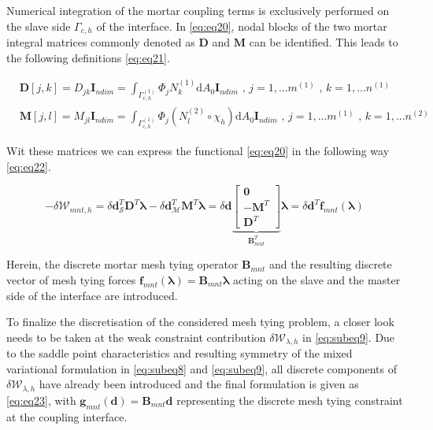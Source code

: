 \documentclass[a4paper,10pt]{article} %
\begin{document}
Numerical integration of the mortar coupling terms is exclusively performed on the slave side $\Gamma_{c,h}$ of the interface. In \eqref{eq:eq20}, nodal blocks of the two mortar integral matrices commonly denoted as $\mathbf{D}$ and $\mathbf{M}$ can be identified. This leads to the following definitions \eqref{eq:eq21}.

\begin{subequations}\label{eq:eq21}
    \begin{align}
        & \mathbf{D}[j,k] = D_{jk} \mathbf{I}_{ndim} = \int_{\Gamma_{c,h}^{(1)}} \Phi_j N_k^{(1)}\text{d}A_0\mathbf{I}_{ndim}\text{ , } j=1,...m^{(1)}\text{ , } k= 1, ...n^{(1)} \\
        & \mathbf{M}[j,l] = M_{jl} \mathbf{I}_{ndim} = \int_{\Gamma_{c,h}^{(1)}} \Phi_j \left(N_l^{(2)} \circ \chi_h \right)\text{d}A_0\mathbf{I}_{ndim}\text{ , } j=1,...m^{(1)}\text{ , } k= 1, ...n^{(2)}
    \end{align}
\end{subequations}

Wit these matrices we can express the functional \eqref{eq:eq20} in the following way \eqref{eq:eq22}.

\begin{equation}\label{eq:eq22}
 -\delta \mathcal{W}_{mnt,h} = \delta \mathbf{d}_{\mathcal{S}}^T\mathbf{D}^T\boldsymbol{\lambda} - \delta \mathbf{d}_{\mathcal{M}}^T\mathbf{M}^T\boldsymbol{\lambda} = \delta \mathbf{d} \underbrace{\left[\begin{array}{c} \mathbf{0} \\ -\mathbf{M}^T \\ \mathbf{D}^T\end{array} \right]}_{\mathbf{B}^T_{mnt}} \boldsymbol{\lambda} = \delta \mathbf{d}^T \mathbf{f}_{mnt}(\boldsymbol{\lambda})
\end{equation}

Herein, the discrete mortar mesh tying operator $\mathbf{B}_{mnt}$ and the resulting discrete vector of mesh tying forces $\mathbf{f}_{mnt} (\boldsymbol{\lambda}) = \mathbf{B}_{mnt}\boldsymbol{\lambda}$ acting on the slave and the master side of the interface are introduced. 

To finalize the discretisation of the considered mesh tying problem, a closer look needs to
be taken at the weak constraint contribution $\delta \mathcal{W}_{\lambda,h} $ in \eqref{eq:subeq9}. Due to the saddle point characteristics and resulting symmetry of the mixed variational formulation in \eqref{eq:subeq8}  and \eqref{eq:subeq9}, all discrete components of $\delta \mathcal{W}_{\lambda,h}$ have already been introduced and the final formulation is given as \eqref{eq:eq23}, with $\mathbf{g}_{mnt}(\mathbf{d}) = \mathbf{B}_{mnt} \mathbf{d}$ representing the discrete mesh tying constraint at the coupling interface.
\end{document}

